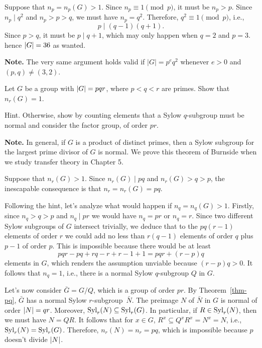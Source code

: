 \begin{solution} Suppose that $n_p=n_p(G)>1$. Since $n_p\equiv1\pmod p$, it must be $n_p>p$. Since $n_p\mid q^2$ and $n_p>p>q$, we must have $n_p=q^2$. Therefore, $q^2\equiv1\pmod p$, i.e., 
$$
    p\mid(q-1)(q+1).
$$
Since $p>q$, it must be $p\mid q+1$, which may only happen when $q=2$ and $p=3$. hence $\left\vert{G}\right\vert=36$ as wanted.  \end{solution}

\textbf{Note.} The very same argument holds valid if $|G|=p^eq^2$ whenever $e>0$ and $(p,q)\ne(3,2)$.


\begin{probl}
    Let\/ $G$ be a group with\/ $\left\vert{G}\right\vert = pqr$, where\/ $p<q<r$ are primes. Show that\/ $n_r(G)=1$.

    \textrm{\upshape Hint. Otherwise, show by counting elements that a Sylow $q$-subgroup must be normal and consider the factor group, of order $pr$.}

    \textrm{\upshape\textbf{Note.} In general, if $G$ is a product of distinct primes, then a Sylow subgroup for the largest prime divisor of $G$ is normal. We prove this theorem of Burnside when we study transfer theory in Chapter 5.}
\end{probl}

\begin{solution} Suppose that $n_r(G)>1$. Since $n_r(G)\mid pq$ and $n_r(G)>q>p$, the inescapable consequence is that $n_r=n_r(G)=pq$.

Following the hint, let's analyze what would happen if $n_q=n_q(G)>1$. Firstly, since $n_q>q>p$ and $n_q\mid pr$ we would have $n_q=pr$ or $n_q=r$. Since two different Sylow subgroups of $G$ intersect trivially, we deduce that to the $pq(r-1)$ elements of order $r$ we could add no less than $r(q-1)$ elements of order $q$ plus $p-1$ of order $p$. This is impossible because there would be at least 
$$
    pqr - pq + rq - r + r - 1 + 1 = pqr + (r-p)q
$$
elements in $G$, which renders the assumption unviable because $(r-p)q>0$. It follows that $n_q=1$, i.e., there is a normal Sylow $q$-subgroup $Q$ in $G$.

Let's now consider $\bar G=G/Q$, which is a group of order $pr$. By Theorem~\ref{thm-pq}, $\bar G$ has a normal Sylow $r$-subgroup~$\bar N$. The preimage $N$ of $\bar N$ in $G$ is normal of order $\left\vert{N}\right\vert=qr$. Moreover, ${\rm Syl}_r(N)\subseteq{\rm Syl}_r(G)$. In particular, if $R\in{\rm Syl}_r(N)$, then we must have $N=QR$. It follows that for $x\in G$, $R^x\subseteq Q^xR^x=N^x=N$, i.e., ${\rm Syl}_r(N)={\rm Syl}_r(G)$. Therefore, $n_r(N)=n_r=pq$, which is impossible because $p$ doesn't divide $\left\vert{N}\right\vert$.  \end{solution}

